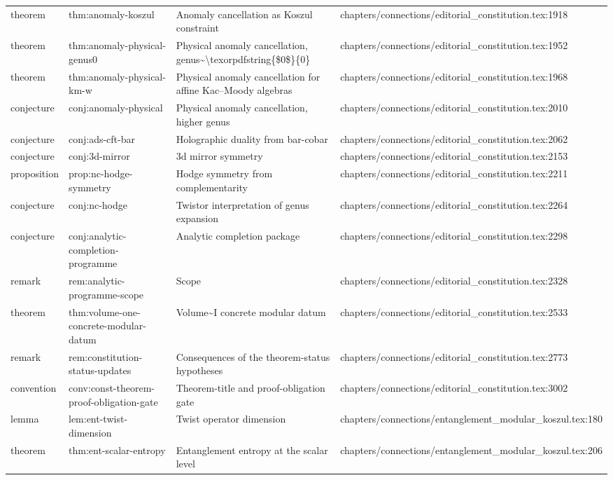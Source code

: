 \documentclass[11pt]{article}
\begin{document}
\begin{longtable}{L{0.10\textwidth}L{0.26\textwidth}L{0.42\textwidth}L{0.22\textwidth}}
theorem & thm:anomaly-koszul & Anomaly cancellation as Koszul constraint & chapters/connections/editorial\_constitution.tex:1918\\
theorem & thm:anomaly-physical-genus0 & Physical anomaly cancellation, genus\textasciitilde{}\textbackslash{}texorpdfstring\{\$0\$\}\{0\} & chapters/connections/editorial\_constitution.tex:1952\\
theorem & thm:anomaly-physical-km-w & Physical anomaly cancellation for affine Kac--Moody algebras & chapters/connections/editorial\_constitution.tex:1968\\
conjecture & conj:anomaly-physical & Physical anomaly cancellation, higher genus & chapters/connections/editorial\_constitution.tex:2010\\
conjecture & conj:ads-cft-bar & Holographic duality from bar-cobar & chapters/connections/editorial\_constitution.tex:2062\\
conjecture & conj:3d-mirror & 3d mirror symmetry & chapters/connections/editorial\_constitution.tex:2153\\
proposition & prop:nc-hodge-symmetry & Hodge symmetry from complementarity & chapters/connections/editorial\_constitution.tex:2211\\
conjecture & conj:nc-hodge & Twistor interpretation of genus expansion & chapters/connections/editorial\_constitution.tex:2264\\
conjecture & conj:analytic-completion-programme & Analytic completion package & chapters/connections/editorial\_constitution.tex:2298\\
remark & rem:analytic-programme-scope & Scope & chapters/connections/editorial\_constitution.tex:2328\\
theorem & thm:volume-one-concrete-modular-datum & Volume\textasciitilde{}I concrete modular datum & chapters/connections/editorial\_constitution.tex:2533\\
remark & rem:constitution-stat{}us-updates & Consequences of the theorem-stat{}us hypotheses & chapters/connections/editorial\_constitution.tex:2773\\
convention & conv:const-theorem-proof-obligation-gate & Theorem-title and proof-obligation gate & chapters/connections/editorial\_constitution.tex:3002\\
lemma & lem:ent-twist-dimension & Twist operator dimension & chapters/connections/entanglement\_modular\_koszul.tex:180\\
theorem & thm:ent-scalar-entropy & Entanglement entropy at the scalar level & chapters/connections/entanglement\_modular\_koszul.tex:206\\

\end{longtable}
\end{document}
